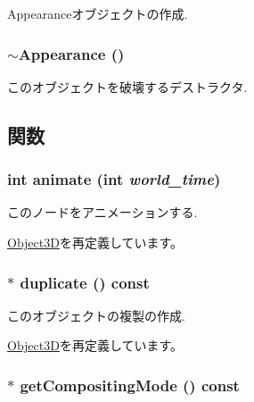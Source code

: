 Appearanceオブジェクトの作成. \hypertarget{classm3g_1_1Appearance_c05c93d7a0f286cb9471b6c667ffeee1}{
\subsubsection[{$\sim$Appearance}]{\setlength{\rightskip}{0pt plus 5cm}$\sim${\bf Appearance} ()}}
\label{classm3g_1_1Appearance_c05c93d7a0f286cb9471b6c667ffeee1}


このオブジェクトを破壊するデストラクタ. 

\subsection{関数}
\hypertarget{classm3g_1_1Appearance_8aad1ceab4c2a03609c8a42324ce484d}{
\subsubsection[{animate}]{\setlength{\rightskip}{0pt plus 5cm}int animate (int {\em world\_\-time})}}
\label{classm3g_1_1Appearance_8aad1ceab4c2a03609c8a42324ce484d}


このノードをアニメーションする. 

\hyperlink{classm3g_1_1Object3D_8aad1ceab4c2a03609c8a42324ce484d}{Object3D}を再定義しています。\hypertarget{classm3g_1_1Appearance_ceaab703eb45cba7cf8705bc3a087127}{
\subsubsection[{duplicate}]{ $\ast$ duplicate () const}}
\label{classm3g_1_1Appearance_ceaab703eb45cba7cf8705bc3a087127}


このオブジェクトの複製の作成. 

\hyperlink{classm3g_1_1Object3D_a25110dac934f867b83b73ad4741a0f4}{Object3D}を再定義しています。\hypertarget{classm3g_1_1Appearance_e4045934febb56891c15e14486b239a8}{
\subsubsection[{getCompositingMode}]{ $\ast$ getCompositingMode () const}}
\label{classm3g_1_1Appearance_e4045934febb56891c15e14486b239a8}


